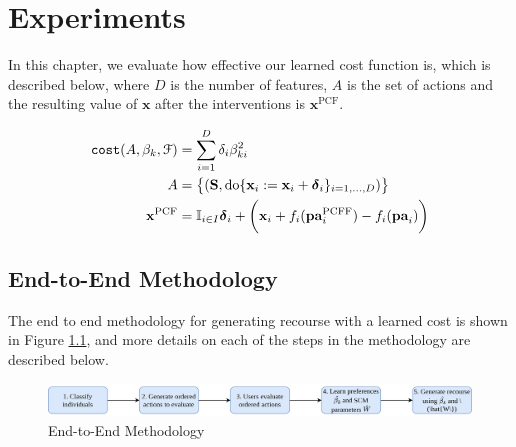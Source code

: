 \chapter{Experiments} \label{chapter:experiments}

In this chapter, we evaluate how effective our learned cost function is, which is described below, where $D$ is the number of features, $A$ is the set of actions and the resulting value of $\mathbf{x}$ after the interventions is $\mathbf{x}^{\text{PCF}}$.

\begin{align} \label{eq:cost_function_experiments}
	\operatorname*{\texttt{cost}}(A, \beta_k, \mathcal{F}) & = \sum_{i=1}^D \delta_i \beta_{ki}^2 \\ \nonumber
	A & = \big\{(\mathbf{S}, \text{do} \{\mathbf{x}_i:=\mathbf{x}_i + \boldsymbol{\delta}_i\}_{i=1, \ldots, D})\big\} \\ \nonumber
	\mathbf{x}^{\text{PCF}} & = \mathbb{I}_{i \in I} \boldsymbol{\delta}_i + \bigg( \mathbf{x}_i + f_i(\textbf{pa}^{\text{PCFF}}_i) - f_i(\textbf{pa}_i) \bigg)
\end{align}

\section{End-to-End Methodology}

The end to end methodology for generating recourse with a learned cost is shown in Figure \ref{fig:workflow}, and more details on each of the steps in the methodology are described below.

\begin{figure}[!htb]
	\centering
	\includegraphics[width=\linewidth]{images/draw.io/workflow.png}
	\caption{End-to-End Methodology}
	\label{fig:workflow}
\end{figure}

